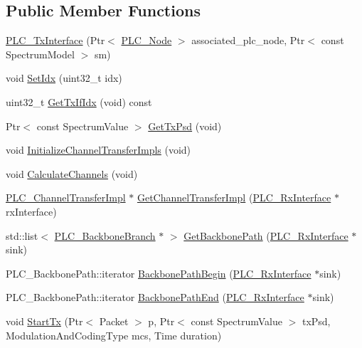 \subsection*{\-Public \-Member \-Functions}
\begin{DoxyCompactItemize}
\item 
\hyperlink{classns3_1_1PLC__TxInterface_aff6a3c7efa2b90340580e72006525267}{\-P\-L\-C\-\_\-\-Tx\-Interface} (\-Ptr$<$ \hyperlink{classns3_1_1PLC__Node}{\-P\-L\-C\-\_\-\-Node} $>$ associated\-\_\-plc\-\_\-node, \-Ptr$<$ const \-Spectrum\-Model $>$ sm)
\item 
void \hyperlink{classns3_1_1PLC__TxInterface_a88a9bf7b50d5fa11a5adcb09b5398239}{\-Set\-Idx} (uint32\-\_\-t idx)
\item 
uint32\-\_\-t \hyperlink{classns3_1_1PLC__TxInterface_ad89273d8968ace83a49c39bbe3bab3fc}{\-Get\-Tx\-If\-Idx} (void) const 
\item 
\-Ptr$<$ const \-Spectrum\-Value $>$ \hyperlink{classns3_1_1PLC__TxInterface_a85f0732d7d01349f56d6bcbecc3e3c62}{\-Get\-Tx\-Psd} (void)
\item 
void \hyperlink{classns3_1_1PLC__TxInterface_ad6c95936608eeb3b081f9b8eb5e46c87}{\-Initialize\-Channel\-Transfer\-Impls} (void)
\item 
void \hyperlink{classns3_1_1PLC__TxInterface_a9d5e237a329135b8f73178200f94bbc9}{\-Calculate\-Channels} (void)
\item 
\hyperlink{classns3_1_1PLC__ChannelTransferImpl}{\-P\-L\-C\-\_\-\-Channel\-Transfer\-Impl} $\ast$ \hyperlink{classns3_1_1PLC__TxInterface_abcb48efd0fa3c23f04646e93e6c7ebbe}{\-Get\-Channel\-Transfer\-Impl} (\hyperlink{classns3_1_1PLC__RxInterface}{\-P\-L\-C\-\_\-\-Rx\-Interface} $\ast$rx\-Interface)
\item 
std\-::list$<$ \hyperlink{classns3_1_1PLC__BackboneBranch}{\-P\-L\-C\-\_\-\-Backbone\-Branch} $\ast$ $>$ \hyperlink{classns3_1_1PLC__TxInterface_a13001bc1b0947eac4b31d3f86dfbc848}{\-Get\-Backbone\-Path} (\hyperlink{classns3_1_1PLC__RxInterface}{\-P\-L\-C\-\_\-\-Rx\-Interface} $\ast$sink)
\item 
\-P\-L\-C\-\_\-\-Backbone\-Path\-::iterator \hyperlink{classns3_1_1PLC__TxInterface_a7a0f421716fa2999885f3dfa9e00649e}{\-Backbone\-Path\-Begin} (\hyperlink{classns3_1_1PLC__RxInterface}{\-P\-L\-C\-\_\-\-Rx\-Interface} $\ast$sink)
\item 
\-P\-L\-C\-\_\-\-Backbone\-Path\-::iterator \hyperlink{classns3_1_1PLC__TxInterface_abef68692750f3bb5a11bf6c37d1b3af6}{\-Backbone\-Path\-End} (\hyperlink{classns3_1_1PLC__RxInterface}{\-P\-L\-C\-\_\-\-Rx\-Interface} $\ast$sink)
\item 
void \hyperlink{classns3_1_1PLC__TxInterface_a35e0b32414508038c169efc345dbd1e2}{\-Start\-Tx} (\-Ptr$<$ \-Packet $>$ p, \-Ptr$<$ const \-Spectrum\-Value $>$ tx\-Psd, \-Modulation\-And\-Coding\-Type mcs, \-Time duration)
\end{DoxyCompactItemize}
